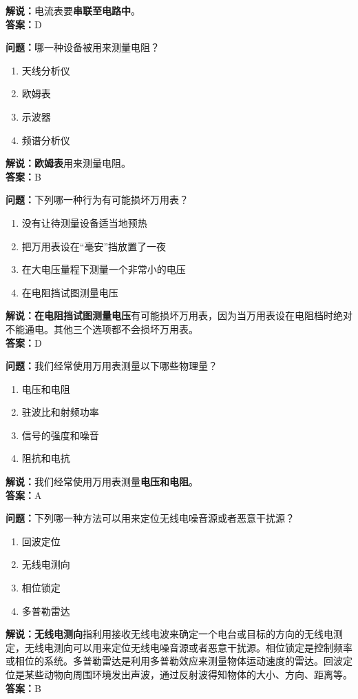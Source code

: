\textbf{解说：}电流表要\textbf{串联至电路中}。\\\textbf{答案：}D



\textbf{问题：}哪一种设备被用来测量电阻？

\begin{enumerate}[label=\Alph*), leftmargin=1.5cm]
	\item 天线分析仪
	\item 欧姆表
	\item 示波器
	\item 频谱分析仪
\end{enumerate}

\textbf{解说：欧姆表}用来测量电阻。\\\textbf{答案：}B



\textbf{问题：}下列哪一种行为有可能损坏万用表？

\begin{enumerate}[label=\Alph*), leftmargin=1.5cm]
	\item 没有让待测量设备适当地预热
	\item 把万用表设在“毫安”挡放置了一夜
	\item 在大电压量程下测量一个非常小的电压
	\item 在电阻挡试图测量电压
\end{enumerate}

\textbf{解说：在电阻挡试图测量电压}有可能损坏万用表，因为当万用表设在电阻档时绝对不能通电。其他三个选项都不会损坏万用表。\\\textbf{答案：}D



\textbf{问题：}我们经常使用万用表测量以下哪些物理量？

\begin{enumerate}[label=\Alph*), leftmargin=1.5cm]
	\item 电压和电阻
	\item 驻波比和射频功率
	\item 信号的强度和噪音
	\item 阻抗和电抗
\end{enumerate}

\textbf{解说：}我们经常使用万用表测量\textbf{电压和电阻}。\\\textbf{答案：}A


\textbf{问题：}下列哪一种方法可以用来定位无线电噪音源或者恶意干扰源？

\begin{enumerate}[label=\Alph*), leftmargin=1.5cm]
	\item 回波定位
	\item 无线电测向
	\item 相位锁定
	\item 多普勒雷达
\end{enumerate}

\textbf{解说：无线电测向}指利用接收无线电波来确定一个电台或目标的方向的无线电测定，无线电测向可以用来定位无线电噪音源或者恶意干扰源。相位锁定是控制频率或相位的系统。多普勒雷达是利用多普勒效应来测量物体运动速度的雷达。回波定位是某些动物向周围环境发出声波，通过反射波得知物体的大小、方向、距离等。\\\textbf{答案：}B%
